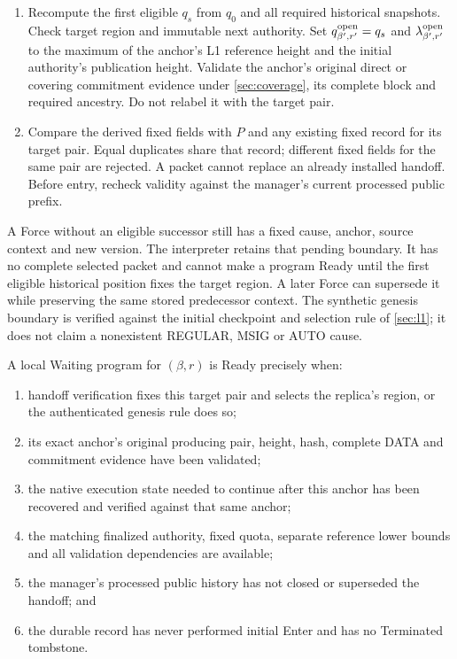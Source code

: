 \begin{enumerate}[label=(\roman*),itemsep=2pt]
prefix. An intervening effective Force supersedes this boundary.
\item Recompute the first eligible $q_s$ from $q_0$ and all required
historical snapshots. Check target region and immutable next authority.
Set $q^{\rm open}_{\beta',r'}=q_s$ and
$\lambda^{\rm open}_{\beta',r'}$ to the maximum of the anchor's L1
reference height and the initial authority's publication height.
Validate the anchor's original direct or covering commitment evidence
under \cref{sec:coverage}, its complete block and required ancestry.
Do not relabel it with the target pair.
\item Compare the derived fixed fields with $P$ and any existing
fixed record for its target pair. Equal duplicates share that record;
different fixed fields for the same pair are rejected. A packet cannot
replace an already installed handoff. Before entry, recheck validity
against the manager's current processed public prefix.
\end{enumerate}

A Force without an eligible successor still has a fixed cause,
anchor, source context and new version. The interpreter retains that
pending boundary. It has no complete selected packet and cannot make
a program Ready until the first eligible historical position fixes
the target region. A later Force can supersede it while preserving the
same stored predecessor context. The synthetic genesis boundary is
verified against the initial checkpoint and selection rule of
\cref{sec:l1}; it does not claim a nonexistent REGULAR, MSIG or AUTO
cause.

\begin{definition}
\label{def:ready}
A local Waiting program for $(\beta,r)$ is Ready precisely when:
\begin{enumerate}[label=(\roman*)]
\item handoff verification fixes this target pair and selects the
replica's region, or the authenticated genesis rule does so;
\item its exact anchor's original producing pair, height, hash,
complete DATA and commitment evidence have been validated;
\item the native execution state needed to continue after this
anchor has been recovered and verified against that same anchor;
\item the matching finalized authority, fixed quota, separate
reference lower bounds and all validation dependencies are available;
\item the manager's processed public history has not closed or
superseded the handoff; and
\item the durable record has never performed initial Enter and has
no Terminated tombstone.
\end{enumerate}
\end{definition}

